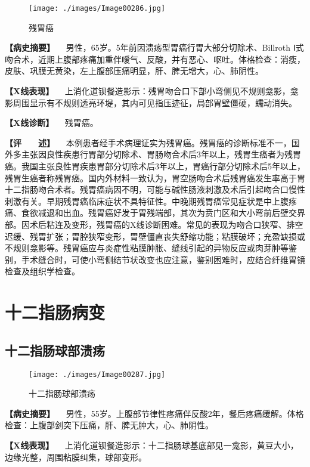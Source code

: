 \begin{figure}[!htbp]
 \centering
 \texttt{[image: ./images/Image00286.jpg]}
 \captionsetup{justification=centering}
 \caption{残胃癌}
 \label{fig5-3-24}
  \end{figure} 

\textbf{【病史摘要】}
　男性，65岁。5年前因溃疡型胃癌行胃大部分切除术、Billroth
Ⅰ式吻合术，近期上腹部疼痛加重伴嗳气、反酸，并有恶心、呕吐。体格检查：消瘦，皮肤、巩膜无黄染，左上腹部压痛明显，肝、脾无增大，心、肺阴性。

\textbf{【X线表现】}
　上消化道钡餐造影示：残胃吻合口下部小弯侧见不规则龛影，龛影周围显示有不规则透亮环堤，其内可见指压迹征，局部胃壁僵硬，蠕动消失。

\textbf{【X线诊断】} 　残胃癌。

\textbf{【评　　述】}
　本例患者经手术病理证实为残胃癌。残胃癌的诊断标准不一，国外多主张因良性疾患行胃部分切除术、胃肠吻合术后3年以上，残胃生癌者为残胃癌。我国主张良性胃疾患胃部分切除术后3年以上，胃癌行部分切除术后5年以上，残胃生癌者称残胃癌。国内外材料一致认为，胃空肠吻合术后残胃癌发生率高于胃十二指肠吻合术者。残胃癌病因不明，可能与碱性肠液刺激及术后引起吻合口慢性刺激有关。早期残胃癌临床症状不具特征性。中晚期残胃癌常见症状是中上腹疼痛、食欲减退和出血。残胃癌好发于胃残端部，其次为贲门区和大小弯前后壁交界部。因术后粘连及变形，残胃癌的X线诊断困难。常见的表现为吻合口狭窄、排空迟缓、残胃扩张；胃腔狭窄变形，胃壁僵直丧失舒缩功能；粘膜破坏；充盈缺损或不规则龛影等。残胃癌应与炎症性粘膜肿胀、缝线引起的异物反应或肉芽肿等鉴别，手术缝合时，可使小弯侧结节状改变也应注意，鉴别困难时，应结合纤维胃镜检查及组织学检查。

\section{十二指肠病变}

\subsection{十二指肠球部溃疡}

\begin{figure}[!htbp]
 \centering
 \texttt{[image: ./images/Image00287.jpg]}
 \captionsetup{justification=centering}
 \caption{十二指肠球部溃疡}
 \label{fig5-4-1}
  \end{figure} 

\textbf{【病史摘要】}
　男性，55岁。上腹部节律性疼痛伴反酸2年，餐后疼痛缓解。体格检查：上腹部剑突下压痛，肝、脾无肿大，心、肺阴性。

\textbf{【X线表现】}
　上消化道钡餐造影示：十二指肠球基底部见一龛影，黄豆大小，边缘光整，周围粘膜纠集，球部变形。

